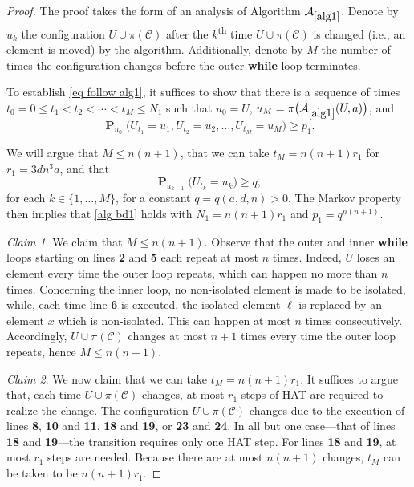 \documentclass[11pt,reqno]{amsart}
\theoremstyle{definition}
\numberwithin{equation}{section}
\newcommand{\1}{\mathbf{1}}
\DeclareMathOperator{\PP}{\mathbf{P}}
\newcommand{\CC}{\mathcal{C}}
\begin{document}
\begin{proof}
The proof takes the form of an analysis of Algorithm $\mathcal{A}_{\ref{alg1}}$. Denote by $u_{k}$ the configuration $U \cup \pi (\CC)$ after the $k$\textsuperscript{th} time $U \cup \pi (\CC)$ is changed (i.e., an element is moved) by the algorithm. Additionally, denote by $M$ the number of times the configuration changes before the outer {\bf while} loop terminates. 

To establish \eqref{eq follow alg1}, it suffices to show that there is a sequence of times $t_0 = 0 \leq t_1 < t_2 < \cdots < t_M \leq N_1$ such that $u_{0} = U$, $u_{M} = \pi \big( \mathcal{A}_{\ref{alg1}} (U,a) \big)$, and
\begin{equation}\label{alg bd1}
\PP_{u_0} \big( U_{t_1} = u_1, U_{t_2} = u_2, \dots, U_{t_M} = u_{M} \big) \geq p_1.
\end{equation}


We will argue that $M \leq n(n+1)$, that we can take $t_M = n(n+1)r_1$ for $r_1 = 3dn^3 a$, and that
\begin{equation}\label{alg bd22}
\PP_{u_{k-1}} \big( U_{t_k} = u_k \big) \geq q,
\end{equation}
for each $k \in \{1,\dots,M\}$, for a constant $q = q(a,d,n) > 0$. The Markov property then implies that \eqref{alg bd1} holds with $N_1 = n(n+1)r_1$ and $p_1 = q^{n(n+1)}$.


{\em Claim 1}. We claim that $M \leq n(n+1)$. Observe that the outer and inner {\bf while} loops starting on lines {\bf 2} and {\bf 5} each repeat at most $n$ times. Indeed, $U$ loses an element every time the outer loop repeats, which can happen no more than $n$ times. Concerning the inner loop, no non-isolated element is made to be isolated, while, each time line {\bf 6} is executed, the isolated element $\ell$ is replaced by an element $x$ which is non-isolated. This can happen at most $n$ times consecutively. Accordingly, $U \cup \pi (\CC)$ changes at most $n+1$ times every time the outer loop repeats, hence $M \leq n (n+1)$.

{\em Claim 2}. We now claim that we can take $t_M = n(n+1)r_1$. It suffices to argue that, each time $U \cup \pi (\CC)$ changes, at most $r_1$ steps of HAT are required to realize the change. The configuration $U \cup \pi (\CC)$ changes due to the execution of lines {\bf 8}, {\bf 10} and {\bf 11}, {\bf 18} and {\bf 19}, or {\bf 23} and {\bf 24}. In all but one case---that of lines {\bf 18} and {\bf 19}---the transition requires only one HAT step. For lines {\bf 18} and {\bf 19}, at most $r_1$ steps are needed. Because there are at most $n(n+1)$ changes, $t_M$ can be taken to be $n(n+1)r_1$.


\end{proof}
\end{document}
